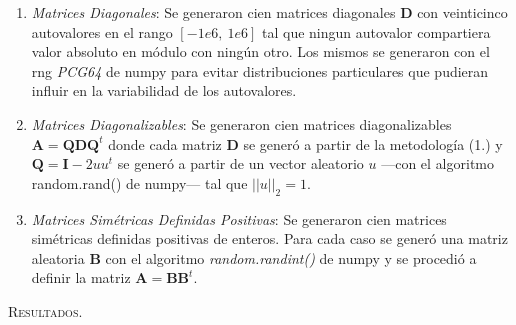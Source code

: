 \vspace{1em}
\begin{enumerate}
    \item \textit{Matrices Diagonales}: Se generaron cien matrices diagonales \textbf{D} con veinticinco autovalores en el rango $[-1e6,\ 1e6]$ tal que ningun autovalor compartiera valor absoluto en módulo con ningún otro. Los mismos se generaron con el rng \textit{PCG64} de numpy para evitar distribuciones particulares que pudieran influir en la variabilidad de los autovalores.

    \item \textit{Matrices Diagonalizables}: Se generaron cien matrices diagonalizables $\mathbf{A} = \mathbf{Q}\mathbf{D}\mathbf{Q}^t$ donde cada matriz $\mathbf{D}$ se generó a partir de la metodología (1.) y $\mathbf{Q} = \mathbf{I} - 2uu^t$ se generó a partir de un vector aleatorio $u$ ---con el algoritmo random.rand() de numpy--- tal que $||u||_2 = 1$.

    \item \textit{Matrices Simétricas Definidas Positivas}: Se generaron cien matrices simétricas definidas positivas de enteros. Para cada caso se generó una matriz aleatoria \textbf{B} con el algoritmo \textit{random.randint()} de numpy y se procedió a definir la matriz $\mathbf{A} = \mathbf{B} \mathbf{B}^t$. 

\end{enumerate}


\vspace{1em}
\noindent \textsc{Resultados}. 
